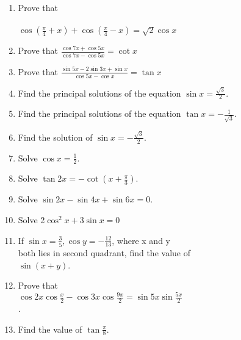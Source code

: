 \begin{enumerate}[label=\arabic*]
\item Prove that\\
\\$\cos(\frac{\pi}{4}+x) + \cos(\frac{\pi}{4}-x) = \sqrt 2\cos x$\\


\item Prove that $\frac{\cos7x+\cos5x}{\cos7x-\cos5x} = \cot x$\\


\item Prove that $\frac{\sin5x-2\sin3x+\sin x}{\cos5x-\cos x} = \tan x$\\


\item Find the principal solutions of the equation $\sin x = \frac{\sqrt 3}{2}$.\\


\item Find the principal solutions of the equation $\tan x = -\frac{1}{\sqrt 3}$.\\


\item Find the solution of $\sin x = -\frac{\sqrt 3}{2}$.\\


\item Solve $\cos x = \frac{1}{2}$.\\


\item Solve $\tan2x=-\cot(x+\frac{\pi}{3})$.\\

\item Solve $\sin2x-\sin4x+\sin6x=0$.\\


\item Solve 2$\cos^{2}x+3\sin x=0$\\

\item If $\sin x=\frac{3}{5}, \cos y=-\frac{12}{13}$, where x and y\\ 
both lies in second quadrant, find the value of\\
$\sin(x+y)$.\\


\item Prove that\\
$\cos2x\cos\frac{x}{2}-\cos3x\cos\frac{9x}{2}=\sin5x\sin\frac{5x}{2}$\\.


\item Find the value of $\tan\frac{\pi}{8}$.\\



\end{enumerate}
